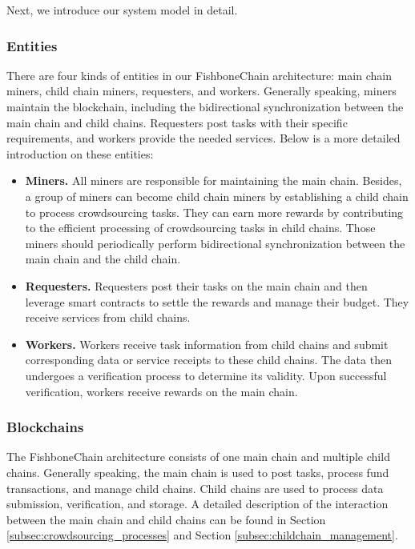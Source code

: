 \documentclass[10pt,journal]{IEEEtran}
\begin{document}
Next, we introduce our system model in detail.

\subsubsection{\textbf{Entities}}
There are four kinds of entities in our FishboneChain architecture: main chain miners, child chain miners, requesters, and workers. Generally speaking, miners maintain the blockchain, including the bidirectional synchronization between the main chain and child chains. Requesters post tasks with their specific requirements, and workers provide the needed services.
Below is a more detailed introduction on these entities:

\begin{itemize}
    \item \textbf{Miners.}
    All miners are responsible for maintaining the main chain. Besides, a group of miners can become child chain miners by establishing a child chain to process crowdsourcing tasks. They can earn more rewards by contributing to the efficient processing of crowdsourcing tasks in child chains. Those miners should periodically perform bidirectional synchronization between the main chain and the child chain.

    \item \textbf{Requesters.} Requesters post their tasks on the main chain and then leverage smart contracts to settle the rewards and manage their budget. They receive services from child chains.

    \item \textbf{Workers.} Workers receive task information from child chains and submit corresponding data or service receipts to these child chains. The data then undergoes a verification process to determine its validity. Upon successful verification, workers receive rewards on the main chain.
\end{itemize}

\subsubsection{\textbf{Blockchains}}

The FishboneChain architecture consists of one main chain and multiple child chains. Generally speaking, the main chain is used to post tasks, process fund transactions, and manage child chains. Child chains are used to process data submission, verification, and storage. A detailed description of the interaction between the main chain and child chains can be found in Section \ref{subsec:crowdsourcing_processes} and Section \ref{subsec:childchain_management}.
\end{document}
